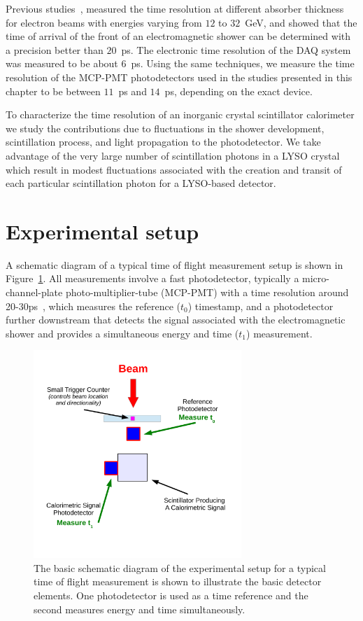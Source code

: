 Previous studies~\cite{MCPFastCaloNIMA}, measured the time resolution at different
absorber thickness for electron beams with energies varying from $12$ to
$32$~GeV, and showed that the time of arrival of the front of an electromagnetic
shower can be determined with a precision better than $20$~ps. The electronic
time resolution of the DAQ system was measured to be about $6$~ps. Using
the same techniques, we measure the time resolution of the MCP-PMT photodetectors 
used in the studies presented in this chapter to be between $11$~ps and $14$~ps, depending 
on the exact device.

To characterize the time resolution of an inorganic crystal scintillator calorimeter we
study the contributions due to fluctuations in the shower development, scintillation process, 
and light propagation to the photodetector.  We take advantage of the very large number of 
scintillation photons in a LYSO crystal which result in modest fluctuations associated with the 
creation and transit of each particular scintillation photon for a LYSO-based detector. 

\section{Experimental setup}

A schematic diagram of a typical time of flight measurement setup is shown in 
Figure~\ref{fig:TypicalSchematicDiagram}. All measurements involve a fast photodetector,  
typically a micro-channel-plate photo-multiplier-tube 
(MCP-PMT) with a time resolution around 20-30\unit{ps}~\cite{MCPFastCaloNIMA}, which measures the reference ($t_{0}$) timestamp, and a photodetector further 
downstream that detects the signal associated with the electromagnetic shower and provides 
a simultaneous energy and time ($t_{1}$) measurement. 

\begin{figure}[H] \centering
\includegraphics[width=0.7\textwidth]{figs/timing/TypicalSchematicDiagram} 
\caption{ The basic schematic diagram of the experimental setup for
a typical time of flight measurement is shown to illustrate the
basic detector elements. One photodetector is used as a time reference and the second 
measures energy and time simultaneously.} 
\label{fig:TypicalSchematicDiagram}
\end{figure}

